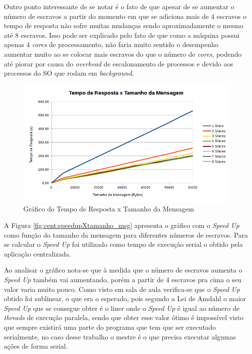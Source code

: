 \documentclass[
	12pt,				%
    oneside,			%
	a4paper,			%
	english,			%
	brazil,				%
	]{abntex2}
\begin{document}
Outro ponto interessante de se notar é o fato de que apesar de se aumentar o número de escravos a partir do momento em que se adiciona mais de 4 escravos o tempo de resposta não sofre muitas mudanças sendo aproximadamente o mesmo até 8 escravos. Isso
pode ser explicado pelo fato de que como a máquina possui apenas 4 \textit{cores} de processamento, não faria muito sentido o desempenho aumentar muito ao se colocar mais escravos do que o número de \textit{cores}, podendo até piorar por causa do \textit{overhead} de escalonamento de processos e devido aos processos do SO que rodam em \textit{background}.


\begin{figure}[!htb]
\centering
\includegraphics[scale=0.65]{figuras/temporesposta_centralizado.png}
\caption{Gráfico do Tempo de Resposta x Tamanho da Mensagem}
\label{fig:cent:tempo_respostaXtamanho_msg}
\end{figure}

A Figura \ref{fig:cent:speedupXtamanho_msg} apresenta o gráfico com o \textit{Speed Up} como função do tamanho da mensagem para diferentes números de escravos. Para se calcular o \textit{Speed Up} foi utilizado como tempo de execução serial o obtido pela aplicação centralizada.

Ao analisar o gráfico nota-se que à medida que o número de escravos aumenta o \textit{Speed Up} também vai aumentando, porém 
a partir de 4 escravos pra cima o seu valor varia muito pouco. Como visto em sala de aula verifica-se que o \textit{Speed Up}
obtido foi sublinear, o que era o esperado, pois segundo a Lei de Amdahl o maior \textit{Speed Up} que se consegue obter é o liner onde o \textit{Speed Up} é igual ao número de \textit{threads} de execução paralela, sendo que obter esse valor ótimo é
impossível visto que sempre existirá uma parte do programa que tem que ser executado serialmente, no caso desse trabalho o 
mestre é o que precisa executar algumas ações de forma serial.
\end{document}
